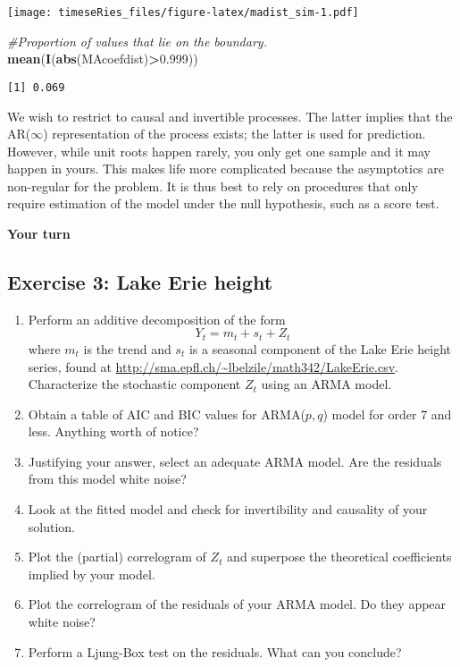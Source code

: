 \documentclass[]{book}
\newenvironment{Shaded}{\begin{snugshade}}{\end{snugshade}}
\newcommand{\KeywordTok}[1]{\textcolor[rgb]{0.13,0.29,0.53}{\textbf{#1}}}
\newcommand{\FloatTok}[1]{\textcolor[rgb]{0.00,0.00,0.81}{#1}}
\newcommand{\CommentTok}[1]{\textcolor[rgb]{0.56,0.35,0.01}{\textit{#1}}}
\newcommand{\OperatorTok}[1]{\textcolor[rgb]{0.81,0.36,0.00}{\textbf{#1}}}
\newcommand{\NormalTok}[1]{#1}
\providecommand{\tightlist}{%
  \setlength{\itemsep}{0pt}\setlength{\parskip}{0pt}}
\begin{document}
\texttt{[image: timeseRies\_files/figure-latex/madist\_sim-1.pdf]}

\begin{Shaded}
\begin{Highlighting}[]
\CommentTok{#Proportion of values that lie on the boundary.}
\KeywordTok{mean}\NormalTok{(}\KeywordTok{I}\NormalTok{(}\KeywordTok{abs}\NormalTok{(MAcoefdist)}\OperatorTok{>}\FloatTok{0.999}\NormalTok{))}
\end{Highlighting}
\end{Shaded}

\begin{verbatim}
[1] 0.069
\end{verbatim}

We wish to restrict to causal and invertible processes. The latter
implies that the AR(\(\infty\)) representation of the process exists;
the latter is used for prediction. However, while unit roots happen
rarely, you only get one sample and it may happen in yours. This makes
life more complicated because the asymptotics are non-regular for the
problem. It is thus best to rely on procedures that only require
estimation of the model under the null hypothesis, such as a score test.

\textbf{Your turn}

\subsection{Exercise 3: Lake Erie
height}\label{exercise-3-lake-erie-height}

\begin{enumerate}
\def\labelenumi{\arabic{enumi}.}
\tightlist
\item
  Perform an additive decomposition of the form
  \[Y_t = m_t + s_t + Z_t\] where \(m_t\) is the trend and \(s_t\) is a
  seasonal component of the Lake Erie height series, found at
  \href{\%5Bhttp://sma.epfl.ch/~lbelzile/math342/LakeErie.csv\%5D}{http://sma.epfl.ch/\textasciitilde{}lbelzile/math342/LakeErie.csv}.
  Characterize the stochastic component \(Z_t\) using an ARMA model.
\item
  Obtain a table of AIC and BIC values for ARMA(\(p, q\)) model for
  order 7 and less. Anything worth of notice?
\item
  Justifying your answer, select an adequate ARMA model. Are the
  residuals from this model white noise?
\item
  Look at the fitted model and check for invertibility and causality of
  your solution.
\item
  Plot the (partial) correlogram of \(Z_t\) and superpose the
  theoretical coefficients implied by your model.
\item
  Plot the correlogram of the residuals of your ARMA model. Do they
  appear white noise?
\item
  Perform a Ljung-Box test on the residuals. What can you conclude?
\end{enumerate}
\end{document}
